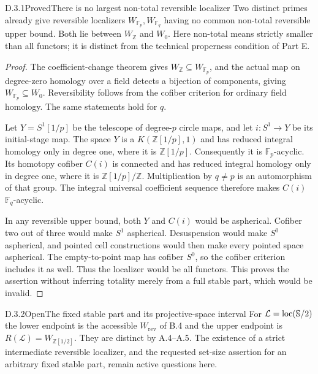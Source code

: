 \begin{claim}{D.3.1}{Proved}{There is no largest non-total reversible localizer}
Two distinct primes already give reversible localizers $W_{\mathbb F_p},W_{\mathbb F_q}$ having no common non-total reversible upper bound. Both lie between $W_{\mathbb Z}$ and $W_0$. Here non-total means strictly smaller than all functors; it is distinct from the technical properness condition of Part E.
\end{claim}
\begin{proof}
The coefficient-change theorem gives $W_{\mathbb Z}\subseteq W_{\mathbb F_p}$, and the actual map on degree-zero homology over a field detects a bijection of components, giving $W_{\mathbb F_p}\subseteq W_0$. Reversibility follows from the cofiber criterion for ordinary field homology. The same statements hold for $q$.

Let $Y=S^1[1/p]$ be the telescope of degree-$p$ circle maps, and let $i:S^1\to Y$ be its initial-stage map. The space $Y$ is a $K(\mathbb Z[1/p],1)$ and has reduced integral homology only in degree one, where it is $\mathbb Z[1/p]$. Consequently it is $\mathbb F_p$-acyclic. Its homotopy cofiber $C(i)$ is connected and has reduced integral homology only in degree one, where it is $\mathbb Z[1/p]/\mathbb Z$. Multiplication by $q\neq p$ is an automorphism of that group. The integral universal coefficient sequence therefore makes $C(i)$ $\mathbb F_q$-acyclic.

In any reversible upper bound, both $Y$ and $C(i)$ would be aspherical. Cofiber two out of three would make $S^1$ aspherical. Desuspension would make $S^0$ aspherical, and pointed cell constructions would then make every pointed space aspherical. The empty-to-point map has cofiber $S^0$, so the cofiber criterion includes it as well. Thus the localizer would be all functors. This proves the assertion without inferring totality merely from a full stable part, which would be invalid.
\end{proof}

\begin{claim}{D.3.2}{Open}{The fixed stable part and its projective-space interval}
For $\mathcal L=\operatorname{loc}(\mathbb S/2)$ the lower endpoint is the accessible $W_{\mathrm{rev}}$ of B.4 and the upper endpoint is $R(\mathcal L)=W_{\mathbb Z[1/2]}$. They are distinct by A.4--A.5. The existence of a strict intermediate reversible localizer, and the requested set-size assertion for an arbitrary fixed stable part, remain active questions here.
\end{claim}

